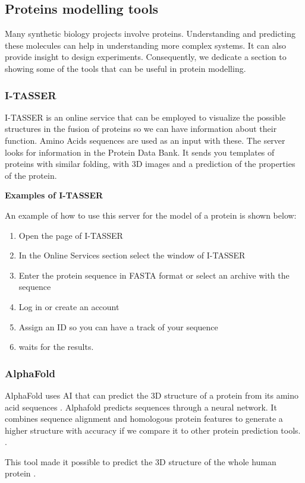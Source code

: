 \documentclass[11pt, letterpaper, english]{article}
\begin{document}
     \subsection{Proteins modelling tools}
    
   Many synthetic biology projects involve proteins. Understanding and predicting these molecules can help in understanding more complex systems. It can also provide insight to design experiments. Consequently, we dedicate a section to showing some of the tools that can be useful in protein modelling.
        \subsubsection{I-TASSER}
        \par{I-TASSER is an online service that can be employed to visualize the possible structures in the fusion of proteins so we can have information about their function. Amino Acids sequences are used as an input with these. The server looks for information in the Protein Data Bank. It sends you templates of proteins with similar folding, with 3D images and a prediction of the properties of the protein. }\\
        \par{\textbf{Examples of I-TASSER}}
        \par{An example of how to use this server for the model of a protein is shown below:}
            \begin{enumerate}[1.]
            \item Open the page of I-TASSER
            \item In the Online Services section select the window of I-TASSER
            \item Enter the protein sequence in FASTA format or select an archive with the sequence
            \item Log in or create an account
            \item Assign an ID so you can have a track of your sequence
            \item waits for the results.
            \end{enumerate}
        \subsubsection{AlphaFold}
            \par{AlphaFold uses AI that can predict the 3D structure of a protein from its amino acid sequences \cite{Kiersten}. Alphafold predicts sequences through a neural network. It combines sequence alignment and homologous protein features to generate a  higher structure with accuracy if we compare it to other protein prediction tools. \cite{DAVID}.}
            \par{This tool made it possible to predict the 3D structure of the whole human protein \cite{DAVID}.}
\end{document}

